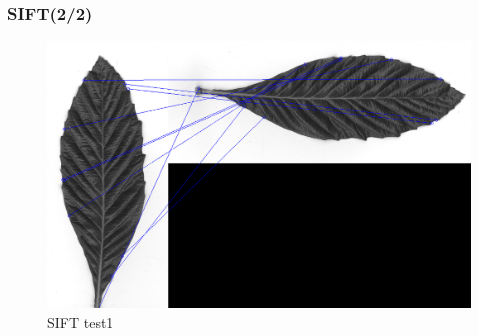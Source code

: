 \documentclass[xcolor=table]{beamer}
\begin{document}
\begin{frame} \frametitle{SIFT(2/2)}

\begin{figure}[htbp]
    \begin{minipage}[c]{.45\linewidth}
      \begin{center}
	\includegraphics[scale=0.20]{Capture1.png}
	\caption{SIFT test1}
	\label{figure:Illustration}
      \end{center}
    \end{minipage}
    \hfill
    \begin{minipage}[c]{.45\linewidth}
      \begin{center}

\end{center}
\end{minipage}
\end{figure}
\end{frame}
\end{document}
